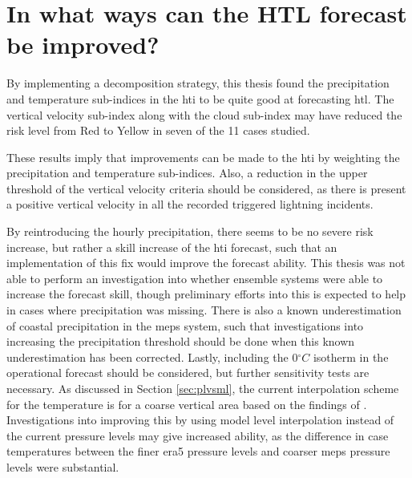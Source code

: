 \section{In what ways can the HTL forecast be improved?}
By implementing a decomposition strategy, this thesis found the precipitation and temperature sub-indices in the \acrlong{hti} to be quite good at forecasting \acrshort{htl}. The vertical velocity sub-index along with the cloud sub-index may have reduced the risk level from Red to Yellow in seven of the 11 cases studied. 

These results imply that improvements can be made to the \acrshort{hti} by weighting the precipitation and temperature sub-indices. Also, a reduction in the upper threshold of the vertical velocity criteria should be considered, as there is present a positive vertical velocity in all the recorded triggered lightning incidents. 

By reintroducing the hourly precipitation, there seems to be no severe risk increase, but rather a skill increase of the \acrshort{hti} forecast, such that an implementation of this fix would improve the forecast ability. This thesis was not able to perform an investigation into whether ensemble systems were able to increase the forecast skill, though preliminary efforts into this is expected to help in cases where precipitation was missing. There is also a known underestimation of coastal precipitation in the \acrshort{meps} system, such that investigations into increasing the precipitation threshold should be done when this known underestimation has been corrected. Lastly, including the 0$^{\circ}C$ isotherm in the operational forecast should be considered, but further sensitivity tests are necessary. As discussed in Section \ref{sec:plvsml}, the current interpolation scheme for the temperature is for a coarse vertical area based on the findings of \cite{wilkinson2013}. Investigations into improving this by using model level interpolation instead of the current pressure levels may give increased ability, as the difference in case temperatures between the finer \acrshort{era5} pressure levels and coarser \acrshort{meps} pressure levels were substantial.



